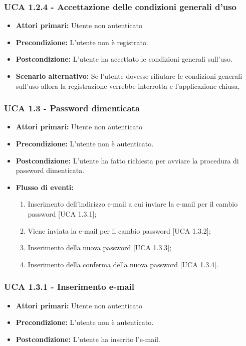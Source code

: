 \subsubsection{UCA 1.2.4 - Accettazione delle condizioni generali d'uso}%
\begin{itemize}
\item \textbf{Attori primari:} Utente non autenticato
\item \textbf{Precondizione:} L'utente non è registrato.
\item \textbf{Postcondizione:} L'utente ha accettato le condizioni generali sull'uso.
\item \textbf{Scenario alternativo:} Se l'utente dovesse rifiutare le condizioni generali sull'uso allora la registrazione verrebbe interrotta e l'applicazione chiusa.
\end{itemize}

\subsubsection{UCA 1.3 - Password dimenticata}%
\begin{itemize}
\item \textbf{Attori primari:} Utente non autenticato
\item \textbf{Precondizione:}  L'utente non è autenticato.
\item \textbf{Postcondizione:} L'utente ha fatto richiesta per avviare la procedura di password dimenticata.
\item \textbf{Flusso di eventi:}
  \begin{enumerate}
        \item Inserimento dell'indirizzo e-mail a cui inviare la e-mail per il cambio password [UCA 1.3.1];
        \item Viene inviata la e-mail per il cambio password [UCA 1.3.2];
        \item Inserimento della nuova password [UCA 1.3.3];
        \item Inserimento della conferma della nuova password [UCA 1.3.4].
    \end{enumerate}
\end{itemize}

\subsubsection{UCA 1.3.1 - Inserimento e-mail}
\begin{itemize}
\item \textbf{Attori primari:} Utente non autenticato
\item \textbf{Precondizione:} L'utente non è autenticato.
\item \textbf{Postcondizione:} L'utente ha inserito l'e-mail.
\end{itemize}

